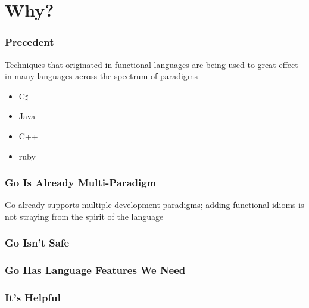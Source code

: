\documentclass{beamer}
\begin{document}
\section{Why?}
\begin{frame}
  \frametitle{Precedent}
  Techniques that originated in functional languages are being used to
  great effect in many languages across the spectrum of paradigms

  \begin{itemize}
  \item C$\sharp$
  \item Java
  \item C++
  \item ruby
  \end{itemize}
\end{frame}

\begin{frame}
  \frametitle{Go Is Already Multi-Paradigm}
  Go already supports multiple development paradigms; adding
  functional idioms is not straying from the spirit of the language
\end{frame}

\begin{frame}
  \frametitle{Go Isn't Safe}

\end{frame}

\begin{frame}
  \frametitle{Go Has Language Features We Need}

\end{frame}

\begin{frame}
  \frametitle{It's Helpful}

\end{frame}
\end{document}
